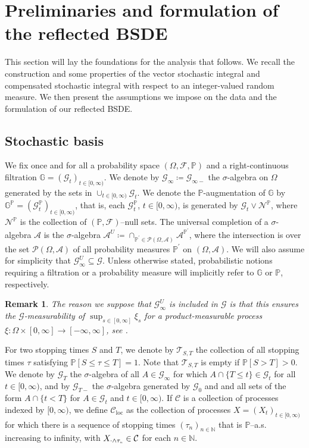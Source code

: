 \documentclass[10pt]{article} %
\newtheorem{remark}[theorem]{Remark}
\newcommand\cA{\mathcal A}
\newcommand\cC{\mathcal C}
\newcommand\cF{\mathcal F}
\newcommand\cG{\mathcal G}
\newcommand\cN{\mathcal N}
\newcommand\cT{\mathcal T}
\newcommand{\smalltext}[1]{\text{\fontsize{4}{4}\selectfont$#1$}}
\def \G{\mathbb{G}}
\def \N{\mathbb{N}}
\def \P{\mathbb{P}}
\def\Ac{\mathcal{A}}
\def\Pc{\mathcal{P}}
\begin{document}
\section{Preliminaries and formulation of the reflected BSDE}\label{sec::preliminaries}

This section will lay the foundations for the analysis that follows. We recall the construction and some properties of the vector stochastic integral and compensated stochastic integral with respect to an integer-valued random measure. We then present the assumptions we impose on the data and the formulation of our reflected BSDE.

\subsection{Stochastic basis}\label{sec::stochastic_basis}

We fix once and for all a probability space $(\Omega,\cF,\P)$ and a right-continuous filtration $\G = (\cG_t)_{t \in [0,\infty)}$. We denote by $\cG_\infty \coloneqq \cG_{\infty-}$ the $\sigma$-algebra on $\Omega$ generated by the sets in $\cup_{t \in [0,\infty)} \cG_t$. We denote the $\P$-augmentation of $\G$ by $\G^\P = (\cG^\P_t)_{t \in [0,\infty)}$, that is, each $\cG^\P_t$, $t \in [0,\infty)$, is generated by $\cG_t \lor \cN^\P$, where $\cN^\P$ is the collection of $(\P,\cF)$--null sets. The universal completion of a $\sigma$-algebra $\cA$ is the $\sigma$-algebra $\cA^U \coloneqq \cap_{\P^\prime\in\Pc(\Omega,\Ac)} \cA^{\P^\prime}$, where the intersection is over the set $\Pc(\Omega,\Ac)$ of all probability measures $\P^\prime$ on $(\Omega,\cA)$. We will also assume for simplicity that $\cG^U_\infty \subseteq \cG$. Unless otherwise stated, probabilistic notions requiring a filtration or a probability measure will implicitly refer to $\G$ or $\P$, respectively. 

\begin{remark}\label{rem::measurability_of_sup}
	The reason we suppose that $\cG^U_\infty$ is included in $\cG$ is that this ensures the $\cG$-measurability of $\sup_{s \in [0,\infty]} \xi_s$ for a product-measurable process $\xi : \Omega \times [0,\infty] \longrightarrow [-\infty,\infty]$, see {\rm\cite[Proposition 2.21]{karoui2013capacities}}.
\end{remark}

For two stopping times $S$ and $T$, we denote by $\cT_{S,T}$ the collection of all stopping times $\tau$ satisfying $\P[S \leq \tau \leq T] = 1$. Note that $\cT_{S,T}$ is empty if $\P[S > T] > 0$. We denote by $\cG_T$ the $\sigma$-algebra of all $A \in \cG_\infty$ for which $A \cap \{T \leq t\} \in \cG_t$ for all $t \in [0,\infty)$, and by $\cG_{T-}$ the $\sigma$-algebra generated by $\cG_0$ and and all sets of the form $A \cap \{t < T\}$ for $A \in \cG_t$ and $t \in [0,\infty)$.  If $\cC$ is a collection of processes indexed by $[0,\infty)$, we define $\cC_\mathrm{loc}$ as the collection of processes $X = (X_t)_{t \in [0,\infty)}$ for which there is a sequence of stopping times $(\tau_n)_{n \in \N}$ that is $\P$--a.s. increasing to infinity, with $X_{\cdot \land \tau_\smalltext{n}} \in \cC$ for each $n \in \N$.
\end{document}

